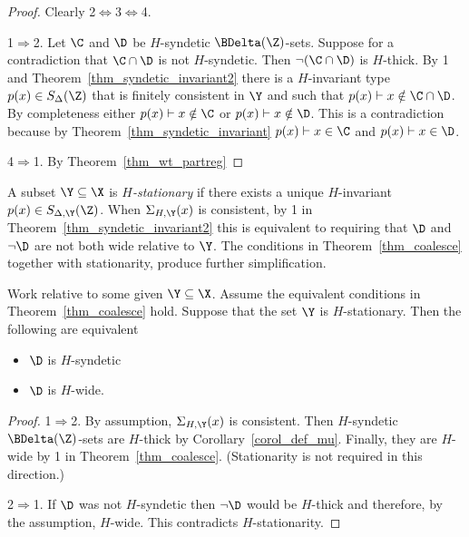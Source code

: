 \begin{proof}
  Clearly 2$\Leftrightarrow$3$\Leftrightarrow$4.

  1$\Rightarrow$2.
  Let $\C$ and $\D$ be $H$-syndetic $\BDelta({\Z})$-sets.
  Suppose for a contradiction that $\C\cap\D$ is not $H$-syndetic.
  Then $\neg(\C\cap\D)$ is $H$-thick.
  By 1 and Theorem~\ref{thm_syndetic_invariant2} there is a $H$-invariant type $p(x)\in S_\Delta(\Z)$ that is finitely consistent in $\Y$ and such that $p(x)\vdash x\notin\C\cap\D$.
  By completeness either $p(x)\vdash x\notin\C$ or $p(x)\vdash x\notin\D$.
  This is a contradiction because by Theorem~\ref{thm_syndetic_invariant} $p(x)\vdash x\in\C$ and $p(x)\vdash x\in\D$.


  4$\Rightarrow$1. By Theorem~\ref{thm_wt_partreg}
\end{proof}


A subset $\Y\subseteq\X$ is \emph{$H$-stationary\/} if there exists a unique $H$-invariant $p(x)\in S_{\Delta,\Y}(\Z)$.
When $\Sigma_{H,\Y}(x)$ is consistent, by 1 in Theorem~\ref{thm_syndetic_invariant2} this is equivalent to requiring that $\D$ and $\neg\D$ are not both wide relative to $\Y$.
The conditions in Theorem~\ref{thm_coalesce} together with stationarity, produce further simplification.

\begin{fact}\label{fact_starionarity_thick_syndetic}
  Work relative to some given $\Y\subseteq\X$.
  Assume the equivalent conditions in Theorem~\ref{thm_coalesce} hold.
  Suppose that the set $\Y$ is $H$-stationary.
  Then the following are equivalent
  \begin{itemize}
    \item [1.] $\D$ is $H$-syndetic
    \item [2.] $\D$ is $H$-wide.
  \end{itemize}\smallskip
\end{fact}

\begin{proof}
  1$\Rightarrow$2.
  By assumption, $\Sigma_{H,\Y}(x)$ is consistent.
  Then $H$-syndetic $\BDelta({\Z})$-sets are $H$-thick by Corollary~\ref{corol_def_mu}.
  Finally, they are  $H$-wide by 1 in Theorem~\ref{thm_coalesce}.
  (Stationarity is not required in this direction.)

  2$\Rightarrow$1.
  If $\D$ was not $H$-syndetic then $\neg\D$ would be $H$-thick and therefore, by the assumption, $H$-wide.
  This contradicts $H$-stationarity.
\end{proof}

